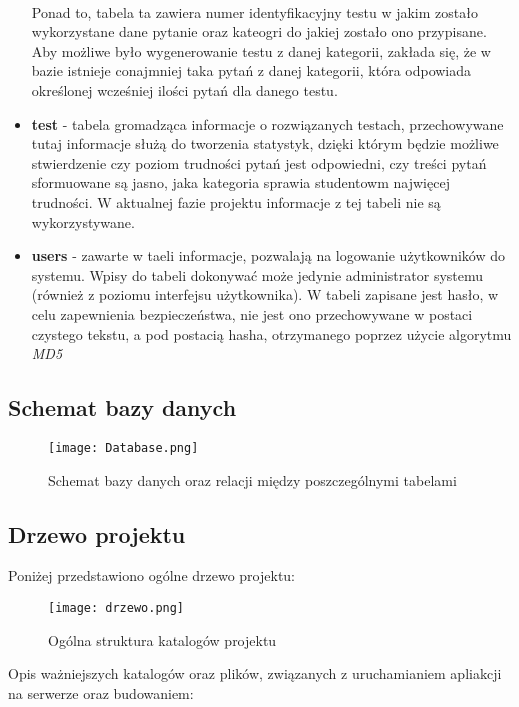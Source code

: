 \documentclass[a4paper, titlepage]{article}
\begin{document}
\begin{itemize}
\\Ponad to, tabela ta zawiera numer identyfikacyjny testu w jakim zostało wykorzystane dane pytanie oraz kateogri do jakiej zostało ono przypisane.
\\Aby możliwe było wygenerowanie testu z danej kategorii, zakłada się, że w bazie istnieje conajmniej taka pytań z danej kategorii, która odpowiada określonej wcześniej ilości pytań dla danego testu.
					\item \textbf{test} - tabela gromadząca informacje o rozwiązanych testach, przechowywane tutaj informacje służą do tworzenia statystyk, dzięki którym będzie możliwe stwierdzenie czy poziom trudności pytań jest odpowiedni, czy treści pytań sformuowane są jasno, jaka kategoria sprawia studentowm najwięcej trudności. W aktualnej fazie projektu informacje z tej tabeli nie są wykorzystywane.
                    \item \textbf{users} - zawarte w taeli informacje, pozwalają na logowanie użytkowników do systemu. Wpisy do tabeli dokonywać może jedynie administrator systemu (również z poziomu interfejsu użytkownika). W tabeli zapisane jest hasło, w celu zapewnienia bezpieczeństwa, nie jest ono przechowywane w postaci czystego tekstu, a pod postacią hasha, otrzymanego poprzez użycie algorytmu \textit{MD5}
                \end{itemize}

\subsection{Schemat bazy danych}
      \begin{figure}[H]
      \centering
      \texttt{[image: Database.png]}
      \caption{Schemat bazy danych oraz relacji między poszczególnymi tabelami}
  \end{figure}

\subsection{Drzewo projektu}

Poniżej przedstawiono ogólne drzewo projektu:

      \begin{figure}[H]
      \centering
      \texttt{[image: drzewo.png]}
      \caption{Ogólna struktura katalogów projektu}
  \end{figure}

Opis ważniejszych katalogów oraz plików, związanych z uruchamianiem apliakcji na serwerze oraz budowaniem:
\end{document}
